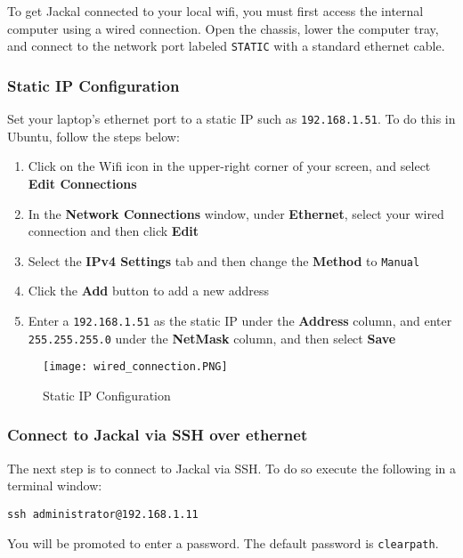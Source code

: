 \documentclass[]{clearpath-latex/clearpath-manual}
\begin{document}
To get Jackal connected to your local wifi, you must first access the internal computer
using a wired connection. Open the chassis, lower the computer tray, and connect to the network port
labeled \lstinline{STATIC} with a standard ethernet cable.

\subsubsection{Static IP Configuration}

Set your laptop's ethernet port to a static IP such as \lstinline{192.168.1.51}.  To do this in Ubuntu, follow the steps below:
\begin{enumerate}
  \item Click on the Wifi icon in the upper-right corner of your screen, and select \textbf{Edit Connections}
  \item In the \textbf{Network Connections} window, under \textbf{Ethernet}, select your wired connection and then click \textbf{Edit}
  \item Select the \textbf{IPv4 Settings} tab and then change the \textbf{Method} to \lstinline{Manual}
  \item Click the \textbf{Add} button to add a new address
  \item Enter a \lstinline{192.168.1.51} as the static IP under the \textbf{Address} column, and enter \lstinline{255.255.255.0} under the \textbf{NetMask} column, and then select \textbf{Save}
\end{enumerate}

\begin{figure}[H]
  \centering
  \texttt{[image: wired\_connection.PNG]}
  \caption{Static IP Configuration}
  \label{staticip}
\end{figure}


\subsubsection{Connect to Jackal via SSH over ethernet}

The next step is to connect to Jackal via SSH.  To do so execute the following in a terminal window:

\begin{lstlisting}
ssh administrator@192.168.1.11
\end{lstlisting}

You will be promoted to enter a password.  The default password is \lstinline{clearpath}.
\end{document}
